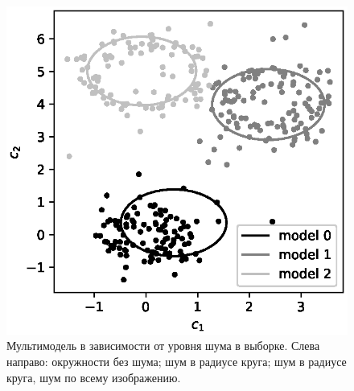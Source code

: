 \documentclass[12pt]{a&t}
\begin{document}
\begin{figure}[h!]
	\includegraphics[height = 0.2\textheight]{902.eps}

\caption{Мультимодель в зависимости от уровня шума в выборке. Слева направо: окружности без шума; шум в радиусе круга; шум в радиусе круга, шум по всему изображению.}
\label{ce:fig3}
\end{figure}
\end{document}
